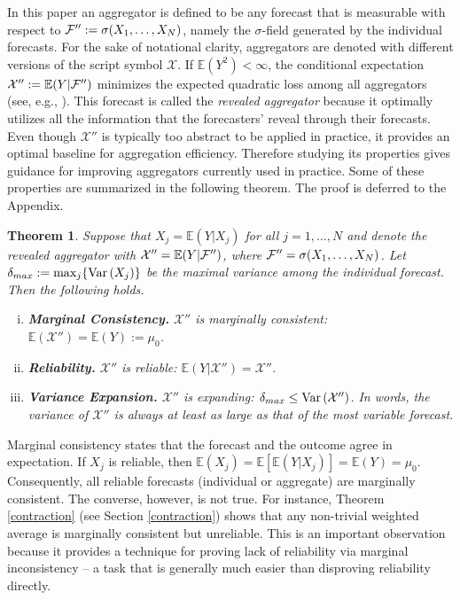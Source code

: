 \documentclass[12pt]{article}
\newcommand{\E}{\mathbb{E}}
\newtheorem{theorem}{Theorem}[section]
\theoremstyle{definition}
\theoremstyle{definition}
\def\F{{\cal F}}
\def\E{{\mathbb E}}
\def\Var{{\rm Var}\,}
\begin{document}
In this paper an aggregator is defined to be any forecast that is measurable with respect to $\F'' := \sigma(X_1, \dots, X_N)$, namely the $\sigma$-field generated by the individual forecasts. For the sake of notational clarity, aggregators are denoted with different versions of the script symbol $\mathcal{X}$. If $\E\left(Y^2\right) < \infty$, the conditional expectation
$\mathcal{X}'' := \E(Y | \F'')$ minimizes the expected quadratic loss
among all aggregators (see, e.g., \citealt{durrett2010probability}). This forecast is called the \textit{revealed
aggregator} because it optimally utilizes all the information that the
forecasters' reveal through their forecasts. Even though
$\mathcal{X}'' $ is typically too abstract to be applied in practice,
it provides an optimal baseline for aggregation
efficiency. Therefore studying its properties gives guidance for
improving aggregators currently used in practice. Some of these
properties are summarized in the following theorem. The proof is deferred to the Appendix.



\begin{theorem} \label{optimal}
Suppose that $X_j = \E(Y | X_j)$ for all $j = 1, \dots, N$ and denote the revealed aggregator with $\mathcal{X}'' = \E(Y | \F'')$, where $\F'' = \sigma(X_1, \dots, X_N)$. 
Let $\delta_{max} := \max_j \{ \Var(X_j)  \}$ be the maximal variance among the individual forecast.
 Then the following holds.
\begin{enumerate}[i)] \label{properties}
\item \textbf{Marginal Consistency.} $\mathcal{X}''$ is marginally consistent:  $\E(\mathcal{X}'') = \E(Y) :=  \mu_0$.
\item \textbf{Reliability.} $\mathcal{X}''$ is reliable: $\E(Y|\mathcal{X}'') = \mathcal{X}''$. 
\item \textbf{Variance Expansion.} $\mathcal{X}''$ is expanding: $\delta_{max} \leq \Var(\mathcal{X}'')$. In words, the variance of $\mathcal{X}''$ is always at least as large as that of the most variable forecast. 
\end{enumerate}
\end{theorem}
Marginal consistency states that the forecast and the outcome agree in expectation. If $X_j$ is reliable, then $\E(X_j) = \E[\E(Y|X_j)] = \E(Y) = \mu_0$. Consequently, all reliable forecasts (individual or aggregate) are marginally consistent. The converse, however, is not true. For instance, Theorem \ref{contraction} (see Section \ref{contraction})  shows that any non-trivial weighted average is marginally consistent but unreliable. This is an important observation because it provides a technique for proving lack of reliability via marginal inconsistency -- a task that is generally much easier than disproving reliability directly.
\end{document}
